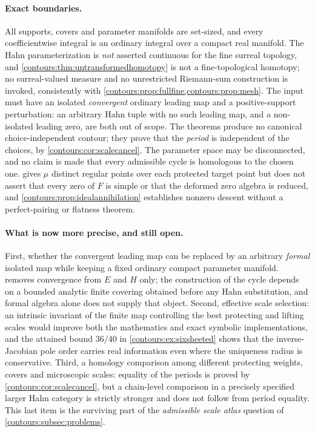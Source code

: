 \documentclass[11pt,letterpaper]{article}
\theoremstyle{definition}
\theoremstyle{remark}
\numberwithin{equation}{section}
\begin{document}
\paragraph{Exact boundaries.}
All supports, covers and parameter manifolds are set-sized, and every
coefficientwise integral is an ordinary integral over a compact real manifold.
The Hahn parameterization is \emph{not} asserted continuous for the fine surreal
topology, and \cref{contours:thm:untransformedhomotopy} is not a
fine-topological homotopy; no surreal-valued measure and no unrestricted
Riemann-sum construction is invoked, consistently with
\cref{contours:prop:fullfine,contours:prop:mesh}. The input must have an isolated
\emph{convergent} ordinary leading map and a positive-support perturbation: an
arbitrary Hahn tuple with no such leading map, and a non-isolated leading zero,
are both out of scope. The theorems produce no canonical choice-independent
contour; they prove that the \emph{period} is independent of the choices, by
\cref{contours:cor:scalecancel}. The parameter space may be disconnected, and no
claim is made that every admissible cycle is homologous to the chosen one.
 gives $\mu$ distinct regular points over each
protected target point but does not assert that every zero of $F$ is simple or
that the deformed zero algebra is reduced, and
\cref{contours:prop:idealannihilation} establishes nonzero descent without a
perfect-pairing or flatness theorem.

\paragraph{What is now more precise, and still open.}
First, whether the convergent leading map can be replaced by an arbitrary
\emph{formal} isolated map while keeping a fixed ordinary compact parameter
manifold.  removes convergence from $E$ and
$H$ only; the construction of the cycle depends on a bounded analytic finite
covering obtained before any Hahn substitution, and formal algebra alone does
not supply that object. Second, effective scale selection: an intrinsic
invariant of the finite map controlling the best protecting and lifting scales
would improve both the mathematics and exact symbolic implementations, and the
attained bound $36/40$ in \cref{contours:ex:sixsheeted} shows that the
inverse-Jacobian pole order carries real information even where the uniqueness
radius is conservative. Third, a homology comparison among different protecting
weights, covers and microscopic scales: equality of the periods is proved by
\cref{contours:cor:scalecancel}, but a chain-level comparison in a precisely
specified larger Hahn category is strictly stronger and does not follow from
period equality. This last item is the surviving part of the
\emph{admissible scale atlas} question of \cref{contours:subsec:problems}.
\end{document}
